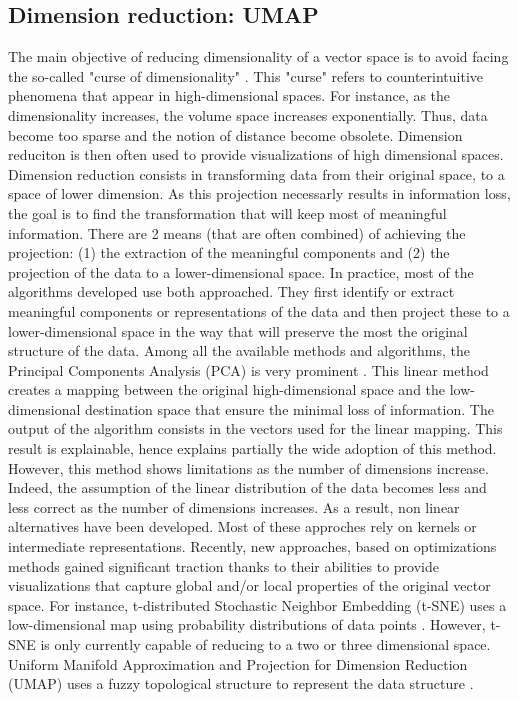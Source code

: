 \subsection{Dimension reduction: UMAP}
The main objective of reducing dimensionality of a vector space is to avoid facing the
so-called "curse of dimensionality" \parencite{bellmanDynamicProgramming1966}.
This "curse" refers to counterintuitive phenomena that appear in high-dimensional spaces.
For instance, as the dimensionality increases, the volume space increases exponentially.
Thus, data become too sparse and the notion of distance become obsolete.
Dimension reduciton is then often used to provide visualizations of high dimensional spaces.
Dimension reduction consists in transforming data from their original space, to a space of lower dimension.
As this projection necessarly results in information loss, the goal is to find the transformation
that will keep most of meaningful information.
There are 2 means (that are often combined) of achieving the projection:
(1) the extraction of the meaningful components and
(2) the projection of the data to a lower-dimensional space.
In practice, most of the algorithms developed use both approached.
They first identify or extract meaningful components or representations of the data and
then project these to a lower-dimensional space in the way that will preserve the most the original structure of the data.
Among all the available methods and algorithms, the Principal Components Analysis (PCA)
is very prominent \parencite{hotellingAnalysisComplexStatistical1933}.
This linear method creates a mapping between the original high-dimensional space and the low-dimensional destination space that ensure the minimal loss of information.
The output of the algorithm consists in the vectors used for the linear mapping.
This result is explainable, hence explains partially the wide adoption of this method.
However, this method shows limitations as the number of dimensions increase.
Indeed, the assumption of the linear distribution of the data becomes less and less correct as the number of dimensions increases.
As a result, non linear alternatives have been developed.
Most of these approches rely on kernels or intermediate representations.
Recently, new approaches, based on optimizations methods  gained significant traction
thanks to their abilities to provide visualizations that capture global and/or local
properties of the original vector space.
For instance, t-distributed Stochastic Neighbor Embedding (t-SNE) uses a low-dimensional
map using probability distributions of data points \parencite{maatenVisualizingDataUsing2008}.
However, t-SNE is only currently capable of reducing to a two or three dimensional space.
Uniform Manifold Approximation and Projection for Dimension Reduction (UMAP) uses a fuzzy
topological structure to represent the data structure \parencite{mcinnesUMAPUniformManifold2020}.

